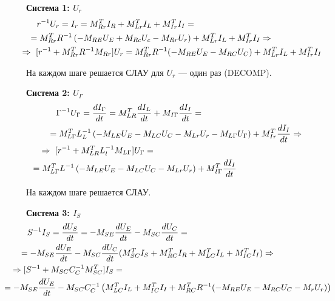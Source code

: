 	\textbf{Система 1: $U_r$}
	\vspace{-0.5em}
	\begin{equation}
		\begin{aligned}
			&r^{-1} U_r = I_r = M_{Rr}^T I_R + M_{Lr}^T I_L + M_{Ir}^T I_I = \nonumber\\ &\hspace{-1em}= M_{Rr}^T R^{-1} \left( -M_{RE} U_E + M_{Rc} U_c - M_{Rr} U_r \right) + M_{Lr}^T I_L + M_{Ir}^T I_I \Rightarrow \nonumber\\
			&\hspace{-2em} \Rightarrow\ [r^{-1} + M_{Rr}^T R^{-1} M_{Rr}] U_r = M_{Rr}^T R^{-1} (-M_{RE} U_E - M_{RC} U_C) + M_{Lr}^T I_L + M_{Ir}^T I_I
		\end{aligned}
	\end{equation}
	
	На каждом шаге решается СЛАУ для $U_r$ — один раз (DECOMP).
	
	\textbf{Система 2: $U_\Gamma$}
	\vspace{-0.5em}
	\begin{equation}
		\begin{aligned}
			&\Gamma^{-1} U_{\Gamma} = \frac{d I_{\Gamma}}{dt} = M_{LR}^T \frac{d I_L}{dt} + M_{I\Gamma} \frac{d I_I}{dt} = \nonumber\\
			&\hspace{-1em}= M_{L\Gamma}^T L_L^{-1} \left( -M_{LE} U_E - M_{LC} U_C - M_{Lr} U_r - M_{L\Gamma} U_{\Gamma} \right) + M_{Ir}^T \frac{d I_I}{dt} \Rightarrow \nonumber\\
			&\hspace{-2em}\Rightarrow\ [r^{-1} + M_{LR}^T L_l^{-1} M_{L\Gamma}] U_{\Gamma} =\nonumber\\
			&\hspace{-3em}= M_{L\Gamma}^T L^{-1} \left( -M_{LE} U_E - M_{LC} U_C - M_{Lr} U_r \right) + M_{I\Gamma}^T \frac{d I_I}{dt}
		\end{aligned}
	\end{equation}
	
	На каждом шаге решается СЛАУ.
	
	\textbf{Система 3: $I_S$}
	\vspace{-0.5em}
	\begin{equation}
		\begin{aligned}
			&S^{-1} I_S = \frac{d U_S}{dt} = -M_{SE} \frac{d U_E}{dt} - M_{SC} \frac{d U_C}{dt} = \nonumber\\ 
			&\hspace{-1em}= -M_{SE} \frac{d U_E}{dt} - M_{SC} \frac{d U_C}{dt} (M_{SC}^T I_S + M_{RC}^T I_R + M_{LC}^T I_L + M_{IC}^T I_I) \Rightarrow \nonumber\\
			&\hspace{-2em}\Rightarrow [S^{-1} + M_{SC} C_C^{-1} M_{SC}^T] I_S = \nonumber\\
			&\hspace{-3em}= -M_{SE} \frac{d U_E}{dt} - M_{SC} C_C^{-1} \left(M_{LC}^T I_L + M_{IC}^T I_I + M_{RC}^T R^{-1} (-M_{RE} U_E - M_{RC} U_C - M_r U_r) \right)
		\end{aligned}
	\end{equation}
	
